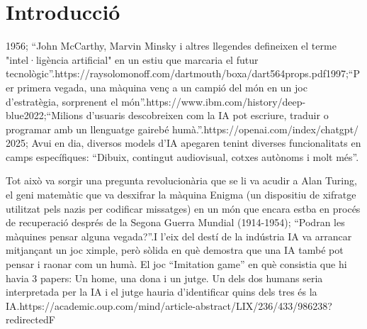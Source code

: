 \chapter{Introducció}
\label{c:intro}
1956; ``John McCarthy, Marvin Minsky i altres llegendes defineixen el terme "intel·ligència artificial" en un estiu que marcaria el futur tecnològic''.{https://raysolomonoff.com/dartmouth/boxa/dart564props.pdf}1997;``Per primera vegada, una màquina venç a un campió del món en un joc d'estratègia, sorprenent el món''.{https://www.ibm.com/history/deep-blue}2022;``Milions d'usuaris descobreixen com la IA pot escriure, traduir o programar amb un llenguatge gairebé humà.''.{https://openai.com/index/chatgpt/} 2025;  Avui en dia, diversos models d'IA apegaren tenint diverses funcionalitats en camps específiques: ``Dibuix, contingut audiovisual, cotxes autònoms i molt més''.

Tot això va sorgir una pregunta revolucionària que se li va acudir a Alan Turing, el geni matemàtic que va desxifrar la màquina Enigma (un dispositiu de xifratge utilitzat pels nazis per codificar missatges) en un món que encara estba en procés de recuperació després de la Segona Guerra Mundial (1914-1954); ``Podran les màquines pensar alguna vegada?''.I l'eix del destí de la indústria IA va arrancar mitjançant un joc ximple, però sòlida en què demostra que una IA també pot pensar i raonar com un humà. El joc ``Imitation game'' en què consistia que hi havia 3 papers: Un home, una dona i un jutge. Un dels dos humans seria interpretada per la IA i el jutge hauria d'identificar quins dels tres és la IA.{https://academic.oup.com/mind/article-abstract/LIX/236/433/986238?redirectedF}
